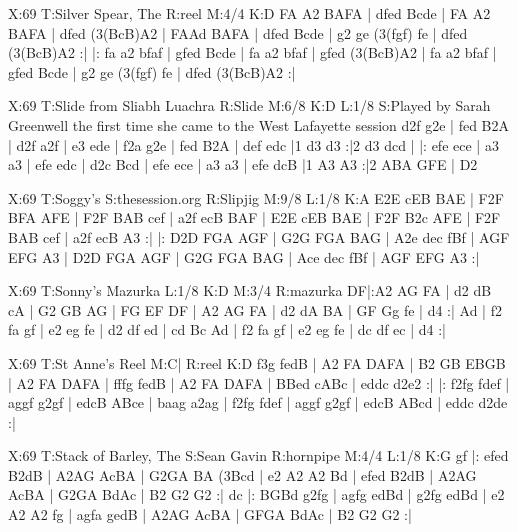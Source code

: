 \documentclass[letterpaper]{article}
\begin{document}
\begin{abc}[name]
X:69
T:Silver Spear, The
R:reel
M:4/4
K:D
FA A2 BAFA | dfed Bcde | FA A2 BAFA | dfed (3(BcB)A2 |
FAAd BAFA | dfed Bcde | g2 ge (3(fgf) fe | dfed (3(BcB)A2 :|
|: fa a2 bfaf | gfed Bcde | fa a2 bfaf | gfed (3(BcB)A2 |
fa a2 bfaf | gfed Bcde | g2 ge (3(fgf) fe | dfed (3(BcB)A2 :|
\end{abc}

\begin{abc}[name]
X:69
T:Slide from Sliabh Luachra
R:Slide
M:6/8
K:D
L:1/8
S:Played by Sarah Greenwell the first time she came to the West Lafayette session
d2f g2e | fed B2A | d2f a2f | e3 ede | 
f2a g2e | fed B2A | def edc |1 d3 d3 :|2 d3 dcd |
|: efe ece | a3 a3 | efe edc | d2c Bcd | 
efe ece | a3 a3 | efe dcB |1  A3 A3 :|2 ABA GFE | D2
\end{abc}

\begin{abc}[name]
X:69
T:Soggy's
S:thesession.org
R:Slipjig
M:9/8
L:1/8
K:A
E2E cEB BAE | F2F BFA AFE | F2F BAB cef | a2f ecB BAF |
E2E cEB BAE | F2F B2c AFE | F2F BAB cef | a2f ecB A3 :|
|: D2D FGA AGF | G2G FGA BAG | A2e dec fBf | AGF EFG A3 |
D2D FGA AGF | G2G FGA BAG | Ace dec fBf | AGF EFG A3 :|
\end{abc}

\begin{abc}[name]
X:69
T:Sonny's Mazurka
L:1/8
K:D
M:3/4
R:mazurka
DF|:A2 AG FA | d2 dB cA | G2 GB AG | FG EF DF |
A2 AG FA | d2 dA BA | GF Gg fe | d4 :|
Ad | f2 fa gf | e2 eg fe | d2 df ed | cd Bc Ad |
f2 fa gf | e2 eg fe | dc df ec | d4 :|
\end{abc}

\begin{abc}[name]
X:69
T:St Anne's Reel
M:C|
R:reel
K:D
f3g fedB | A2 FA DAFA | B2 GB EBGB | A2 FA DAFA |
fffg fedB | A2 FA DAFA | BBed cABc | eddc d2e2 :|
|: f2fg fdef | aggf g2gf | edcB ABce | baag a2ag |
f2fg fdef | aggf g2gf | edcB ABcd | eddc d2de :|
\end{abc}

\begin{abc}[name]
X:69
T:Stack of Barley, The
S:Sean Gavin
R:hornpipe
M:4/4
L:1/8
K:G
gf |: efed B2dB | A2AG AcBA | G2GA BA (3Bcd | e2 A2 A2 Bd |
efed B2dB | A2AG AcBA | G2GA BdAc | B2 G2 G2 :|
dc |: BGBd g2fg | agfg edBd | g2fg edBd | e2 A2 A2 fg |
agfa gedB | A2AG AcBA | GFGA BdAc | B2 G2 G2 :| 
\end{abc}
\end{document}
